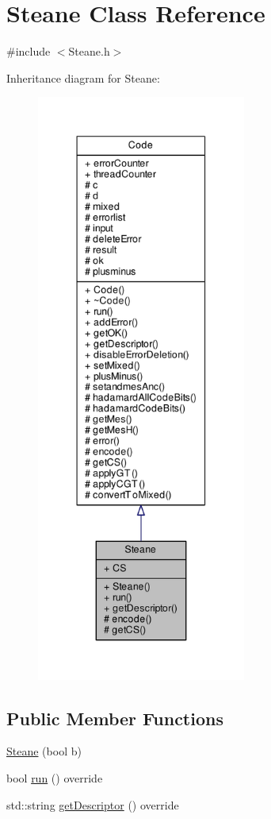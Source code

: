 \hypertarget{class_steane}{}\section{Steane Class Reference}
\label{class_steane}


{\ttfamily \#include $<$Steane.\+h$>$}



Inheritance diagram for Steane\+:
\nopagebreak
\begin{figure}[H]
\begin{center}
\leavevmode
\includegraphics[height=550pt]{class_steane__inherit__graph}
\end{center}
\end{figure}
\subsection*{Public Member Functions}
\begin{DoxyCompactItemize}
\item 
\hyperlink{class_steane_a7cda04d9619fc019d03e16f137851762}{Steane} (bool b)
\item 
bool \hyperlink{class_steane_a0d891a1213b62e1b225fab265fab3fc9}{run} () override
\item 
std\+::string \hyperlink{class_steane_a1fb53da78a66d64cd6aad02735fab4c3}{get\+Descriptor} () override
\end{DoxyCompactItemize}
